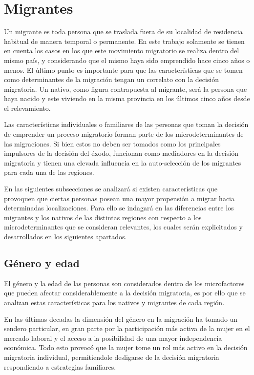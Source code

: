 \documentclass[12pt,a4paper]{article}
\begin{document}
\section{Migrantes}
Un migrante es toda persona que se traslada fuera de su localidad de residencia habitual de manera temporal o permanente. En este trabajo solamente se tienen en cuenta los casos en los que este movimiento migratorio se realiza dentro del mismo país, y considerando que el mismo haya sido emprendido hace cinco años o menos. El último punto es importante para que las características que se tomen como determinantes de la migración tengan un correlato con la decisión migratoria. Un nativo, como figura contrapuesta al migrante, será la persona que haya nacido y este viviendo en la misma provincia en los últimos cinco años desde el relevamiento.

Las características individuales o familiares de las personas que toman la decisión de emprender un proceso migratorio forman parte de los microdeterminantes de las migraciones. Si bien estos no deben ser tomados como los principales impulsores de la decisión del éxodo, funcionan como mediadores en la decisión migratoria y tienen una elevada influencia en la auto-selección de los migrantes para cada una de las regiones.

En las siguientes subsecciones se analizará si existen características que provoquen que ciertas personas posean una mayor propensión a migrar hacia determinadas localizaciones. Para ello se indagará en las diferencias entre los migrantes y los nativos de las distintas regiones con respecto a los microdeterminantes que se consideran relevantes, los cuales serán explicitados y desarrollados en los siguientes apartados.


\subsection{Género y edad}
El género y la edad de las personas son considerados dentro de los microfactores que pueden afectar considerablemente a la decisión migratoria, es por ello que se analizan estas características para los nativos y migrantes de cada región.

En las últimas decadas la dimensión del género en la migración ha tomado un sendero particular, en gran parte por la participación más activa de la mujer en el mercado laboral y el acceso a la posibilidad de una mayor independencia económica. Todo esto provocó que la mujer tome un rol más activo en la decisión migratoria individual, permitiendole desligarse de la decisión migratoria respondiendo a estrategias  familiares.
\end{document}
